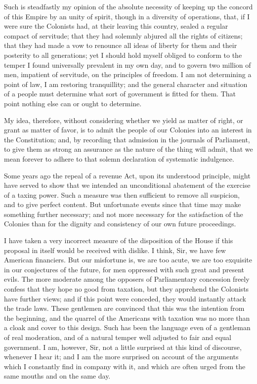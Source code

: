 Such is steadfastly my opinion of the absolute necessity of keeping up the concord of this Empire by an unity of spirit, though in a diversity of operations, that, if I were sure the Colonists had, at their leaving this country, sealed a regular compact of servitude; that they had solemnly abjured all the rights of citizens; that they had made a vow to renounce all ideas of liberty for them and their posterity to all generations; yet I should hold myself obliged to conform to the temper I found universally prevalent in my own day, and to govern two million of men, impatient of servitude, on the principles of freedom. I am not determining a point of law, I am restoring tranquillity; and the general character and situation of a people must determine what sort of government is fitted for them. That point nothing else can or ought to determine.\par

My idea, therefore, without considering whether we yield as matter of right, or grant as matter of favor, is to admit the people of our Colonies into an interest in the Constitution; and, by recording that admission in the journals of Parliament, to give them as strong an assurance as the nature of the thing will admit, that we mean forever to adhere to that solemn declaration of systematic indulgence.\par

Some years ago the repeal of a revenue Act, upon its understood principle, might have served to show that we intended an unconditional abatement of the exercise of a taxing power. Such a measure was then sufficient to remove all suspicion, and to give perfect content. But unfortunate events since that time may make something further necessary; and not more necessary for the satisfaction of the Colonies than for the dignity and consistency of our own future proceedings.\par

I have taken a very incorrect measure of the disposition of the House if this proposal in itself would be received with dislike. I think, Sir, we have few American financiers. But our misfortune is, we are too acute, we are too exquisite in our conjectures of the future, for men oppressed with such great and present evils. The more moderate among the opposers of Parliamentary concession freely confess that they hope no good from taxation, but they apprehend the Colonists have further views; and if this point were conceded, they would instantly attack the trade laws. These gentlemen are convinced that this was the intention from the beginning, and the quarrel of the Americans with taxation was no more than a cloak and cover to this design. Such has been the language even of a gentleman of real moderation, and of a natural temper well adjusted to fair and equal government. I am, however, Sir, not a little surprised at this kind of discourse, whenever I hear it; and I am the more surprised on account of the arguments which I constantly find in company with it, and which are often urged from the same mouths and on the same day.\par

